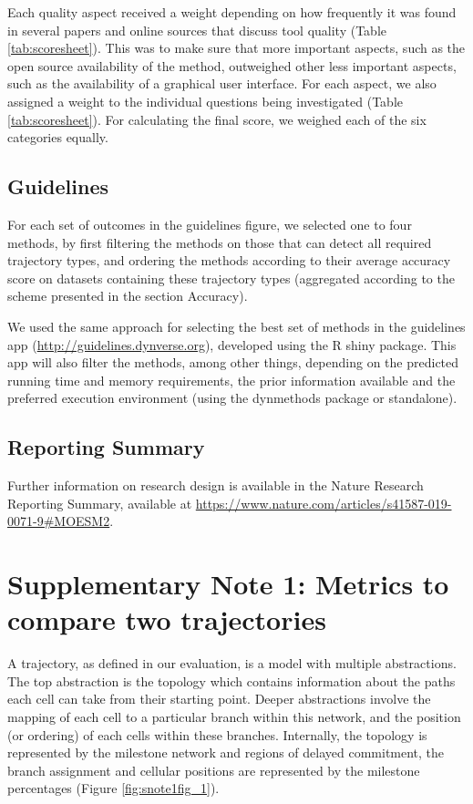 Each quality aspect received a weight depending on how frequently it was found in several papers and online sources that discuss tool quality (Table \ref{tab:scoresheet}). This was to make sure that more important aspects, such as the open source availability of the method, outweighed other less important aspects, such as the availability of a graphical user interface. For each aspect, we also assigned a weight to the individual questions being investigated (Table \ref{tab:scoresheet}). For calculating the final score, we weighed each of the six categories equally.

\subsection{Guidelines}

For each set of outcomes in the guidelines figure, we selected one to four methods, by first filtering the methods on those that can detect all required trajectory types, and ordering the methods according to their average accuracy score on datasets containing these trajectory types (aggregated according to the scheme presented in the section Accuracy).

We used the same approach for selecting the best set of methods in the guidelines app (\href{http://guidelines.dynverse.org}{http://guidelines.dynverse.org}), developed using the R shiny package. This app will also filter the methods, among other things, depending on the predicted running time and memory requirements, the prior information available and the preferred execution environment (using the dynmethods package or standalone).

\subsection{Reporting Summary}

Further information on research design is available in the Nature Research Reporting Summary, available at \href{https://www.nature.com/articles/s41587-019-0071-9\#MOESM2}{https://www.nature.com/articles/s41587-019-0071-9\#MOESM2}.



\section{Supplementary Note 1: Metrics to compare two trajectories} \label{sec:dynb_supn1}

A trajectory, as defined in our evaluation, is a model with multiple abstractions. The top abstraction is the topology which contains information about the paths each cell can take from their starting point. Deeper abstractions involve the mapping of each cell to a particular branch within this network, and the position (or ordering) of each cells within these branches. Internally, the topology is represented by the milestone network and regions of delayed commitment, the branch assignment and cellular positions are represented by the milestone percentages (Figure \ref{fig:snote1fig_1}).

